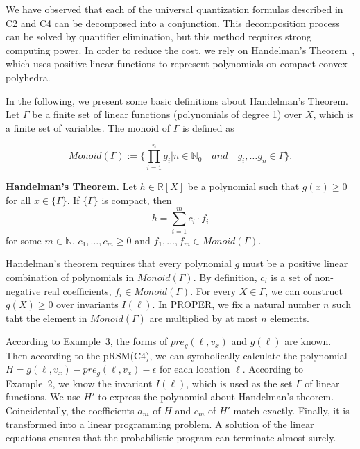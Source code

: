 \documentclass[conference]{IEEEtran}
\begin{document}
 We have observed that each of the universal quantization formulas described in C2 and C4 can be decomposed into a conjunction. This decomposition process can be solved by quantifier elimination, but this method requires strong computing power. In order to reduce the cost, we rely on Handelman's Theorem~\cite{Handelman1988}, which uses positive linear functions to represent polynomials on compact convex polyhedra.
 
 In the following, we present some basic definitions about Handelman's Theorem. Let $\Gamma$ be a finite set of linear functions (polynomials of degree 1) over $X$, which is a finite set of variables. The monoid of $\Gamma$ is defined as
 
 $$Monoid(\Gamma):=\Big\{\prod_{i=1}^{n} g_i|n\in\mathbb{N}_0\quad and \quad g_i,\dots g_n\in\Gamma\Big\}.$$
 
 \textbf{Handelman's Theorem.} Let $h \in \mathbb{R}[X]$ be a polynomial such that $g(x) \ge 0$ for all $x \in \{\Gamma\}$. If $\{\Gamma\}$ is compact, then
 $$h = \sum_{i=1}^{m}c_i\cdot f_i$$
 for some $m \in \mathbb{N}$, $c_1,\dots,c_m\ge 0$ and $f_1,\dots,f_m\in Monoid(\Gamma)$.
 
 Handelman's theorem requires that every polynomial $g$ must be a positive linear combination of polynomials in $Monoid(\Gamma)$. By definition, $c_i$ is a set of non-negative real coefficients, $f_i\in Monoid(\Gamma)$. For every $X\in \Gamma$, we can construct $g(X) \ge 0$ over invariants $I(\ell)$. In PROPER, we fix a natural number $n$ such taht the element in $Monoid(\Gamma)$ are multiplied by at most $n$ elements.
 
 According to Example~3, the forms of $pre_g(\ell,v_x)$ and $g(\ell)$ are known. Then according to the pRSM(C4), we can symbolically calculate the polynomial $H=g(\ell, v_x)-pre_g(\ell,v_x)-\epsilon$ for each location $\ell$. According to Example~2, we know the invariant $I(\ell)$, which is used as the set $\Gamma$ of linear functions. We use $H'$ to express the polynomial about Handelman's theorem.
 Coincidentally, the coefficients $a_{ni}$ of $H$ and $c_m$ of $H'$ match exactly. Finally, it is transformed into a linear programming problem. 
 A solution of the linear equations ensures that the probabilistic program can terminate almost surely.
  
\end{document}
